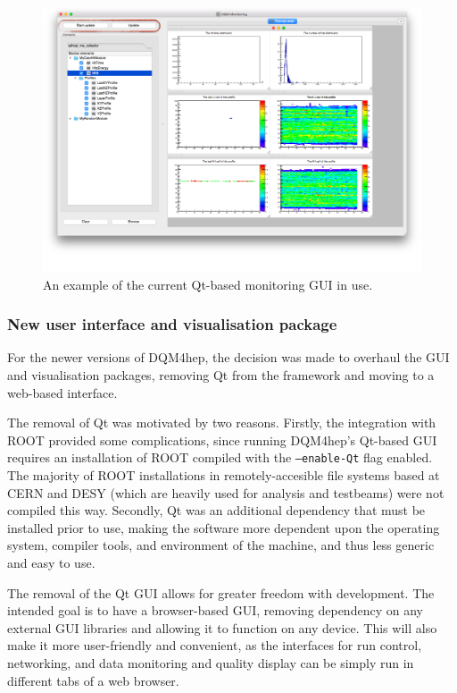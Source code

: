 \begin{figure}[h]
	\centering
	\includegraphics[width=1.0\textwidth]{../Pictures/DQM4hepMonitoringGui.png}
	\caption{An example of the current Qt-based monitoring \acrshort{GUI} in use.}
	\label{figure:daq/dqm4hep/old-gui}
\end{figure}

\subsubsection{New user interface and visualisation package}
For the newer versions of \acrshort{DQM4hep}, the decision was made to overhaul the \acrshort{GUI} and visualisation packages, removing Qt from the framework and moving to a web-based interface.

The removal of Qt was motivated by two reasons. Firstly, the integration with ROOT provided some complications, since running \acrshort{DQM4hep}'s Qt-based \acrshort{GUI} requires an installation of ROOT compiled with the \texttt{--enable-Qt} flag enabled. The majority of ROOT installations in remotely-accesible file systems based at \acrshort{CERN} and \acrshort{DESY} (which are heavily used for analysis and testbeams) were not compiled this way. Secondly, Qt was an additional dependency that must be installed prior to use, making the software more dependent upon the operating system, compiler tools, and environment of the machine, and thus less generic and easy to use. %

The removal of the Qt \acrshort{GUI} allows for greater freedom with development. The intended goal is to have a browser-based GUI, removing dependency on any external \acrshort{GUI} libraries and allowing it to function on any device. This will also make it more user-friendly and convenient, as the interfaces for run control, networking, and data monitoring and quality display can be simply run in different tabs of a web browser.

